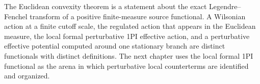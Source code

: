 The Euclidean convexity theorem is a statement about the exact
Legendre--Fenchel transform of a positive finite-measure source functional.  A
Wilsonian action at a finite cutoff scale, the regulated action that appears
in the Euclidean measure, the local formal perturbative 1PI effective action,
and a perturbative effective potential computed around one stationary branch
are distinct functionals with distinct definitions.  The next chapter uses the
local formal 1PI functional as the arena in which perturbative local
counterterms are identified and organized.
